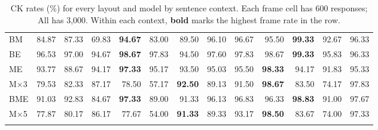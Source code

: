 \documentclass[11pt]{article}
\begin{document}
\begin{CJK*}{UTF8}{gbsn}
{\begin{longtable}{@{}l rrrrrr rrrrrr@{}}
BM & 84.87 & 87.33 & 69.83 & \textbf{94.67} & 83.00 & 89.50 & 96.10 & 96.67 & 95.50 & \textbf{99.33} & 92.67 & 96.33 \\
BE & 96.53 & 97.00 & 94.67 & \textbf{98.67} & 97.83 & 94.50 & 97.60 & 97.83 & 98.67 & \textbf{99.33} & 95.83 & 96.33 \\
ME & 93.77 & 88.67 & 94.17 & \textbf{97.33} & 95.17 & 93.50 & 95.03 & 95.50 & \textbf{98.33} & 94.17 & 91.83 & 95.33 \\
M$\times$3 & 79.53 & 82.33 & 87.17 & 78.50 & 57.17 & \textbf{92.50} & 89.13 & 91.50 & \textbf{98.67} & 83.50 & 74.17 & 97.83 \\
BME & 91.03 & 92.83 & 84.67 & \textbf{97.33} & 89.00 & 91.33 & 96.13 & 96.83 & 96.33 & \textbf{98.83} & 91.00 & 97.67 \\
M$\times$5 & 77.87 & 80.17 & 86.17 & 77.67 & 54.00 & \textbf{91.33} & 89.33 & 93.17 & \textbf{98.50} & 83.67 & 74.00 & 97.33 \\
\hline
\caption{CK rates (\%) for every layout and model by sentence context. Each frame cell has 600 responses; All has 3,000. Within each context, \textbf{bold} marks the highest frame rate in the row.}\label{tab:paper-layout-full}\\
\end{longtable}
}
\twocolumn

\ifPDFTeX\end{CJK*}\fi
\end{document}

